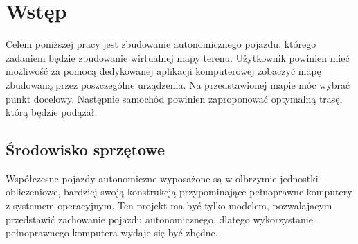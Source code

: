 \section{Wstęp}
    Celem poniższej pracy jest zbudowanie autonomicznego pojazdu, 
    którego zadaniem będzie zbudowanie wirtualnej mapy terenu.
    Użytkownik powinien mieć możliwość za pomocą dedykowanej aplikacji komputerowej zobaczyć mapę zbudowaną przez poszczególne urządzenia.
    Na przedstawionej mapie móc wybrać punkt docelowy. 
    Następnie samochód powinien zaproponować optymalną trasę, którą będzie podążał.


    \subsection{Środowisko sprzętowe}
        Współczesne pojazdy autonomiczne wyposażone są w olbrzymie jednostki obliczeniowe, bardziej swoją konstrukcją przypominające pełnoprawne komputery z systemem operacyjnym.
        Ten projekt ma być tylko modelem, pozwalajacym przedstawić zachowanie pojazdu autonomicznego, dlatego wykorzystanie pełnoprawnego komputera wydaje się być zbędne.

